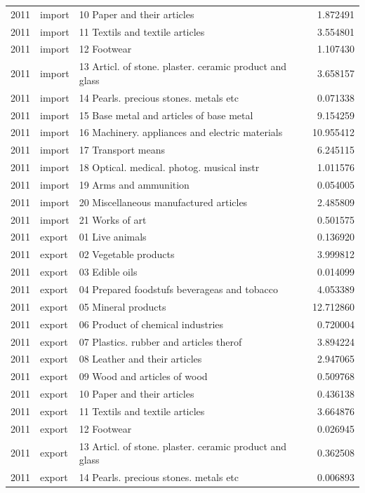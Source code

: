 \begin{tabular}{rllr}
2011 & import & 10 Paper and their articles & 1.872491 \\
2011 & import & 11 Textils and textile articles & 3.554801 \\
2011 & import & 12 Footwear & 1.107430 \\
2011 & import & 13 Articl. of stone. plaster. ceramic product and glass & 3.658157 \\
2011 & import & 14 Pearls. precious stones. metals etc & 0.071338 \\
2011 & import & 15 Base metal and articles of base metal & 9.154259 \\
2011 & import & 16 Machinery. appliances and electric materials & 10.955412 \\
2011 & import & 17 Transport means & 6.245115 \\
2011 & import & 18 Optical. medical. photog. musical instr & 1.011576 \\
2011 & import & 19 Arms and ammunition & 0.054005 \\
2011 & import & 20 Miscellaneous manufactured articles & 2.485809 \\
2011 & import & 21 Works of art & 0.501575 \\
2011 & export & 01 Live animals & 0.136920 \\
2011 & export & 02 Vegetable products & 3.999812 \\
2011 & export & 03 Edible oils & 0.014099 \\
2011 & export & 04 Prepared foodstufs beverageas and tobacco & 4.053389 \\
2011 & export & 05 Mineral products & 12.712860 \\
2011 & export & 06 Product of chemical industries & 0.720004 \\
2011 & export & 07 Plastics. rubber and articles therof & 3.894224 \\
2011 & export & 08 Leather and their articles & 2.947065 \\
2011 & export & 09 Wood and articles of wood & 0.509768 \\
2011 & export & 10 Paper and their articles & 0.436138 \\
2011 & export & 11 Textils and textile articles & 3.664876 \\
2011 & export & 12 Footwear & 0.026945 \\
2011 & export & 13 Articl. of stone. plaster. ceramic product and glass & 0.362508 \\
2011 & export & 14 Pearls. precious stones. metals etc & 0.006893 \\

\end{tabular}
